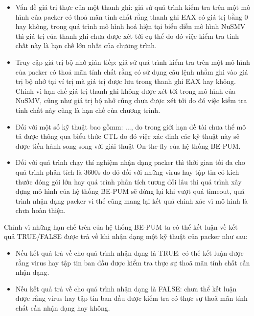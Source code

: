 \begin{itemize}
\item{Vấn đề giá trị thực của một thanh ghi: giả sử quá trình kiểm tra trên một mô hình của packer có thoả mãn tính chất rằng thanh ghi EAX có giá trị bằng 0 hay không, trong quá trình mô hình hoá hiện tại biểu diễn mô hình NuSMV thì giá trị của thanh ghi chưa được xét tới cụ thể do đó việc kiểm tra tính chất này là hạn chế lớn nhất của chương trình.\\}
\item{Truy cập giá trị bộ nhớ gián tiếp: giả sử quá trình kiểm tra trên một mô hình của packer có thoả mãn tính chất rằng có sử dụng câu lệnh nhằm ghi vào giá trị bộ nhớ tại ví trị mà giá trị được lưu trong thanh ghi EAX hay không. Chính vì hạn chế giá trị thanh ghi không được xét tới trong mô hình của NuSMV, cũng như giá trị bộ nhớ cũng chưa được xét tới do đó việc kiểm tra tính chất này cũng là hạn chế của chương trình.\\}
\item{Đối với một số kỹ thuật bao gồmm: ..., do trong giới hạn đề tài chưa thể mô tả được thông qua biểu thức CTL do đó việc xác định các kỹ thuật này sẽ được tiến hành song song với giải thuật On-the-fly của hệ thống BE-PUM.\\}
\item{Đối với quá trình chạy thí nghiệm nhận dạng packer thì thời gian tối đa cho quá trình phân tích là 3600s do đó đối với những virus hay tập tin có kích thước đóng gói lớn hay quá trình phân tích tương đối lâu thì quá trình xây dựng mô hình của hệ thống BE-PUM sẽ dừng lại khi vượt quá timeout, quá trình nhận dạng packer vì thế cũng mang lại kết quả chính xác vì mô hình là chưa hoàn thiện.}
\end{itemize}

\hspace{0.5cm}Chính vì những hạn chế trên của hệ thống BE-PUM ta có thể kết luận về kết quả TRUE/FALSE được trả về khi nhận dạng một kỹ thuật của packer như sau:

\begin{itemize}
\item{Nếu kết quả trả về cho quá trình nhận dạng là TRUE: có thể kết luận được rằng virus hay tập tin ban đầu được kiểm tra thực sự thoã mãn tính chất cần nhận dạng.\\}
\item{Nếu kết quả trả về cho quá trình nhận dạng là FALSE: chưa thể kết luận được rằng virus hay tập tin ban đầu được kiểm tra có thực sự thoã mãn tính chất cần nhận dạng hay không.}
\end{itemize}

